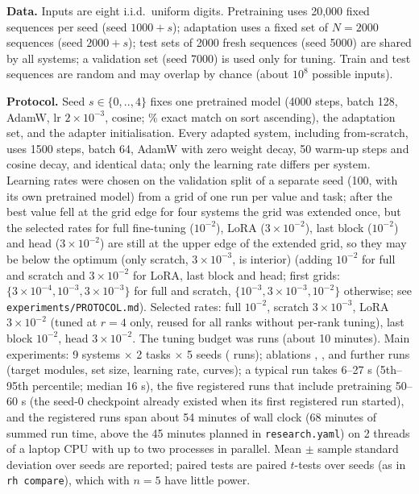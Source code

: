 \textbf{Data.} Inputs are eight i.i.d.\ uniform digits. Pretraining uses 20,000 fixed sequences per seed (seed $1000+s$); adaptation uses a fixed set of $N=2000$ sequences (seed $2000+s$); test sets of 2000 fresh sequences (seed 5000) are shared by all systems; a validation set (seed 7000) is used only for tuning. Train and test sequences are random and may overlap by chance (about $10^{8}$ possible inputs).

\textbf{Protocol.} Seed $s\in\{0,..,4\}$ fixes one pretrained model (4000 steps, batch 128, AdamW, lr $2\times10^{-3}$, cosine; \% exact match on sort ascending), the adaptation set, and the adapter initialisation. Every adapted system, including from-scratch, uses 1500 steps, batch 64, AdamW with zero weight decay, 50 warm-up steps and cosine decay, and identical data; only the learning rate differs per system. Learning rates were chosen on the validation split of a separate seed (100, with its own pretrained model) from a grid of one run per value and task; after the best value fell at the grid edge for four systems the grid was extended once, but the selected rates for full fine-tuning ($10^{-2}$), LoRA ($3\times10^{-2}$), last block ($10^{-2}$) and head ($3\times10^{-2}$) are still at the upper edge of the extended grid, so they may be below the optimum (only scratch, $3\times10^{-3}$, is interior) (adding $10^{-2}$ for full and scratch and $3\times10^{-2}$ for LoRA, last block and head; first grids: $\{3\times10^{-4},10^{-3},3\times10^{-3}\}$ for full and scratch, $\{10^{-3},3\times10^{-3},10^{-2}\}$ otherwise; see \texttt{experiments/PROTOCOL.md}). Selected rates: full $10^{-2}$, scratch $3\times10^{-3}$, LoRA $3\times10^{-2}$ (tuned at $r=4$ only, reused for all ranks without per-rank tuning), last block $10^{-2}$, head $3\times10^{-2}$. The tuning budget was  runs (about 10 minutes). Main experiments: 9 systems $\times$ 2 tasks $\times$ 5 seeds ( runs); ablations , ,  and  further runs (target modules, set size, learning rate, curves); a typical run takes 6--27 s (5th--95th percentile; median 16 s), the five registered runs that include pretraining 50--60 s (the seed-0 checkpoint already existed when its first registered run started), and the  registered runs span about 54 minutes of wall clock (68 minutes of summed run time, above the 45 minutes planned in \texttt{research.yaml}) on 2 threads of a laptop CPU with up to two processes in parallel. Mean $\pm$ sample standard deviation over seeds are reported; paired tests are paired $t$-tests over seeds (as in \texttt{rh compare}), which with $n=5$ have little power.

